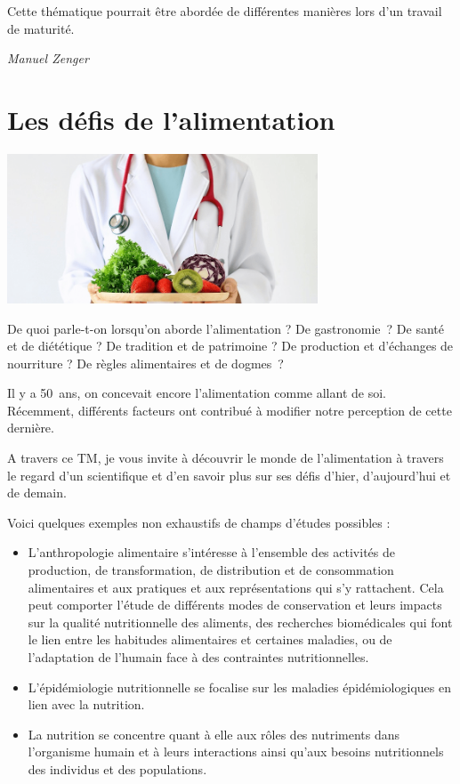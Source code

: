 \documentclass[
  10pt,
  french,
  a5paper,
  openany]{book}
\providecommand{\tightlist}{%
  \setlength{\itemsep}{0pt}\setlength{\parskip}{0pt}}
\newenvironment{signature}{\begin{flushright}}{\end{flushright}}
\begin{document}
Cette thématique pourrait être abordée de différentes manières lors d'un travail de maturité.

\begin{signature}
\emph{Manuel Zenger}

\end{signature}

\hypertarget{les-duxe9fis-de-lalimentation}{%
\chapter{Les défis de l'alimentation}\label{les-duxe9fis-de-lalimentation}}

\begin{center}
\includegraphics[width=\textwidth,height=12em]{images/les-defis-de-lalimentation.png}

\end{center}

De quoi parle-t-on lorsqu'on aborde l'alimentation ? De gastronomie~? De santé et de diététique ? De tradition et de patrimoine ? De production et d'échanges de nourriture ? De règles alimentaires et de dogmes~?

Il y a 50~ans, on concevait encore l'alimentation comme allant de soi. Récemment, différents facteurs ont contribué à modifier notre perception de cette dernière.

A travers ce TM, je vous invite à découvrir le monde de l'alimentation à travers le regard d'un scientifique et d'en savoir plus sur ses défis d'hier, d'aujourd'hui et de demain. ~

Voici quelques exemples non exhaustifs de champs d'études possibles :

\begin{itemize}
\tightlist
\item
  L'anthropologie alimentaire s'intéresse à l'ensemble des activités de production, de transformation, de distribution et de consommation alimentaires et aux pratiques et aux représentations qui s'y rattachent. Cela peut comporter l'étude de différents modes de conservation et leurs impacts sur la qualité nutritionnelle des aliments, des recherches biomédicales qui font le lien entre les habitudes alimentaires et certaines maladies, ou de l'adaptation de l'humain face à des contraintes nutritionnelles.
\item
  L'épidémiologie nutritionnelle se focalise sur les maladies épidémiologiques en lien avec la nutrition.
\item
  La nutrition se concentre quant à elle aux rôles des nutriments dans l'organisme humain et à leurs interactions ainsi qu'aux besoins nutritionnels des individus et des populations.
\end{itemize}
\end{document}
